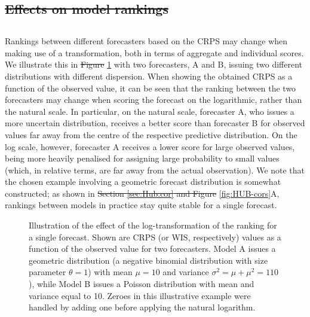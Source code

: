 \documentclass[10pt,letterpaper]{article} %
\providecommand{\DIFaddtex}[1]{{\protect\color{blue}\uwave{#1}}} %
\providecommand{\DIFdeltex}[1]{{\protect\color{red}\sout{#1}}}                      %
\providecommand{\DIFaddbegin}{} %
\providecommand{\DIFaddend}{} %
\providecommand{\DIFdelbegin}{} %
\providecommand{\DIFdelend}{} %
\providecommand{\DIFdelbeginFL}{} %
\providecommand{\DIFdelendFL}{} %
\providecommand{\DIFadd}[1]{\texorpdfstring{\DIFaddtex{#1}}{#1}} %
\providecommand{\DIFdel}[1]{\texorpdfstring{\DIFdeltex{#1}}{}} %
\newcommand{\DIFscaledelfig}{0.5}
\newlength{\DIFdelgraphicswidth} %
\newlength{\DIFdelgraphicsheight} %
\newcommand{\DIFaddincludegraphics}[2][]{{\color{blue}\fbox{\DIFOincludegraphics[#1]{#2}}}} %
\newcommand{\DIFdelincludegraphics}[2][]{%
\sbox{\DIFdelgraphicsbox}{\DIFOincludegraphics[#1]{#2}}%
\settoboxwidth{\DIFdelgraphicswidth}{\DIFdelgraphicsbox} %
\settoboxtotalheight{\DIFdelgraphicsheight}{\DIFdelgraphicsbox} %
\scalebox{\DIFscaledelfig}{%
\parbox[b]{\DIFdelgraphicswidth}{\usebox{\DIFdelgraphicsbox}\\[-\baselineskip] \rule{\DIFdelgraphicswidth}{0em}}\llap{\resizebox{\DIFdelgraphicswidth}{\DIFdelgraphicsheight}{%
\setlength{\unitlength}{\DIFdelgraphicswidth}%
\begin{picture}(1,1)%
\thicklines\linethickness{2pt} %
{\color[rgb]{1,0,0}\put(0,0){\framebox(1,1){}}}%
{\color[rgb]{1,0,0}\put(0,0){\line( 1,1){1}}}%
{\color[rgb]{1,0,0}\put(0,1){\line(1,-1){1}}}%
\end{picture}%
}\hspace*{3pt}}} %
} %
\DeclareRobustCommand{\DIFaddbegin}{\DIFOaddbegin \let\includegraphics\DIFaddincludegraphics} %
\DeclareRobustCommand{\DIFaddend}{\DIFOaddend \let\includegraphics\DIFOincludegraphics} %
\DeclareRobustCommand{\DIFdelbegin}{\DIFOdelbegin \let\includegraphics\DIFdelincludegraphics} %
\DeclareRobustCommand{\DIFdelend}{\DIFOaddend \let\includegraphics\DIFOincludegraphics} %
\DeclareRobustCommand{\DIFdelbeginFL}{\DIFOdelbeginFL \let\includegraphics\DIFdelincludegraphics} %
\DeclareRobustCommand{\DIFdelendFL}{\DIFOaddendFL \let\includegraphics\DIFOincludegraphics} %
\begin{document}
\DIFdelbegin \subsection{\DIFdel{Effects on model rankings}}
\addtocounter{subsection}{-1}%
\DIFdelend \DIFaddbegin \subsection*{\DIFadd{Effects on model rankings}}
\DIFaddend \label{sec:methods:rankings}
Rankings between different forecasters based on the CRPS may change when making use of a transformation, both in terms of aggregate and individual scores. We illustrate this in \DIFdelbegin \DIFdel{Figure }\DIFdelend \DIFaddbegin \DIFadd{Fig }\DIFaddend \ref{fig:illustration-ranking} with two forecasters, A and B, issuing two different distributions with different dispersion. When showing the obtained CRPS as a function of the observed value, it can be seen that the ranking between the two forecasters may change when scoring the forecast on the logarithmic, rather than the natural scale. In particular, on the natural scale, forecaster A, who issues a more uncertain distribution, receives a better score than forecaster B for observed values far away from the centre of the respective predictive distribution. On the log scale, however, forecaster A receives a lower score for large observed values, being more heavily penalised for assigning large probability to small values (which, in relative terms, are far away from the actual observation). We note that the chosen example involving a geometric forecast distribution is somewhat constructed; as shown in \DIFdelbegin \DIFdel{Section \ref{sec:Hub:cor} and Figure }\DIFdelend \DIFaddbegin \DIFadd{Fig }\DIFaddend \ref{fig:HUB-cors}A, rankings between models in practice stay quite stable for a single forecast. 


\begin{figure}[h!]
\centering
\DIFdelbeginFL %
\DIFdelendFL \caption{Illustration of the effect of the log-transformation of the ranking for a single forecast. Shown are CRPS (or WIS, respectively) values as a function of the observed value for two forecasters. Model A issues a geometric distribution (a negative binomial distribution with size parameter $\theta = 1$) with mean $\mu = 10$ and variance $\sigma^2 = \mu + \mu^2 = 110$), while Model B issues a Poisson distribution with mean and variance equal to 10. Zeroes in this illustrative example were handled by adding one before applying the natural logarithm.}
\label{fig:illustration-ranking}
\end{figure}
\end{document}
